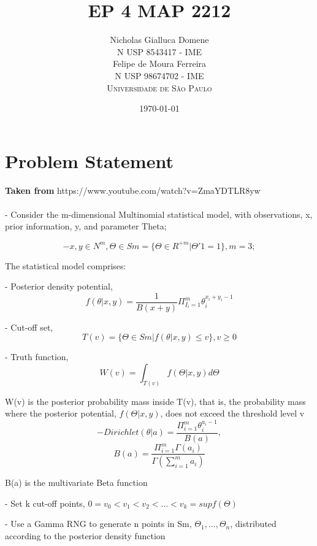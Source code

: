 \documentclass[12pt]{article}
\title{EP 4 MAP 2212} %
\author{Nicholas Gialluca Domene\\ %
N USP 8543417 - IME\\ %
Felipe de Moura Ferreira\\
N USP 98674702 - IME\\
\textsc{Universidade de São Paulo}
}
\date{\today} %
\begin{document}
\setlength{\droptitle}{-5em}    
\maketitle

\section*{Problem Statement}
\textbf{Taken from} https://www.youtube.com/watch?v=ZmaYDTLR8yw
\\ \\
- Consider the m-dimensional Multinomial statistical model,
with observations, x, prior information, y, and parameter Theta;

\begin{equation}
- x, y \in N^m, \Theta \in Sm = \{\Theta \in R^{+m} | \Theta'1 = 1\}, m = 3;
\end{equation}

The statistical model comprises:

- Posterior density potential, 
\begin{equation}
f(\theta|x, y) = \frac{1}{B(x + y)} \Pi_{I_i=1}^{m} \theta_i^{x_i + y_i - 1}
\end{equation}

- Cut-off set, 
\begin{equation}
T(v) = \{\Theta \in Sm | f(\theta|x, y) \leq v\}, v \geq 0
\end{equation}

- Truth function, 
\begin{equation}
W(v) = \int_{T(v)} f(\Theta|x, y) d\Theta
\end{equation}

W(v) is the posterior probability mass inside T(v), that is, 
the probability mass where the posterior potential, $f(\Theta|x, y)$,
does not exceed the threshold level v
\begin{equation}
- Dirichlet(\theta|a) = \frac{\Pi_{i=1}^m \theta_i^{a_i - 1}}{B(a)}, 
\end{equation}
\begin{equation}
B(a) = \frac{\Pi_{i=1}^m \Gamma(a_i)} {\Gamma(\sum_{i=1}^m a_i)}
\end{equation}

B(a) is the multivariate Beta function

- Set k cut-off points, $0 = v_0 < v_1 < v_2 < ... < v_k = sup f(\Theta)$

- Use a Gamma RNG to generate n points in Sm,
$\Theta_1, ..., \Theta_n$, distributed according to
the posterior density function
\end{document}
